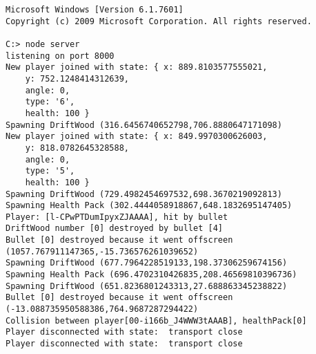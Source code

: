 \documentclass{standalone}
\begin{document}
\begin{lstlisting}[style=DOS]
Microsoft Windows [Version 6.1.7601]
Copyright (c) 2009 Microsoft Corporation. All rights reserved.

C:> node server
listening on port 8000
New player joined with state: { x: 889.8103577555021,
	y: 752.1248414312639,
	angle: 0,
	type: '6',
	health: 100 }
Spawning DriftWood (316.6456740652798,706.8880647171098)
New player joined with state: { x: 849.9970300626003,
	y: 818.0782645328588,
	angle: 0,
	type: '5',
	health: 100 }
Spawning DriftWood (729.4982454697532,698.3670219092813)
Spawning Health Pack (302.4444058918867,648.1832695147405)
Player: [l-CPwPTDumIpyxZJAAAA], hit by bullet 
DriftWood number [0] destroyed by bullet [4]
Bullet [0] destroyed because it went offscreen (1057.767911147365,-15.736576261039652)
Spawning DriftWood (677.7964228519133,198.37306259674156)
Spawning Health Pack (696.4702310426835,208.46569810396736)
Spawning DriftWood (651.8236801243313,27.688863345238822)
Bullet [0] destroyed because it went offscreen (-13.088735950588386,764.9687287294422)
Collision between player[00-i166b_J4WWW3tAAAB], healthPack[0]
Player disconnected with state:  transport close
Player disconnected with state:  transport close
\end{lstlisting}
\end{document}
